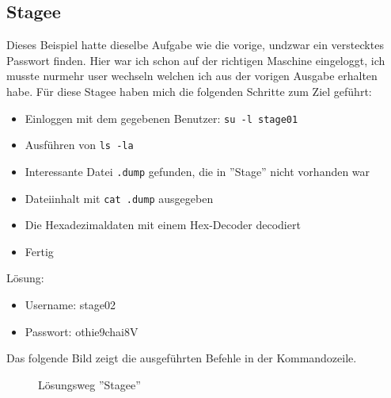 \documentclass[12pt,a4paper,titlepage,oneside]{scrartcl}
\begin{document}
\subsection{Stagee}
Dieses Beispiel hatte dieselbe Aufgabe wie die vorige, undzwar ein verstecktes Passwort finden. Hier war ich schon auf der richtigen Maschine eingeloggt, ich musste nurmehr user wechseln welchen ich aus der vorigen Ausgabe erhalten habe. Für diese Stagee haben mich die folgenden Schritte zum Ziel geführt:

\begin{itemize}
  \item Einloggen mit dem gegebenen Benutzer: \lstinline{su -l stage01}
  \item Ausführen von \lstinline{ls -la}  
  \item Interessante Datei \lstinline{.dump} gefunden, die in ''Stage'' nicht vorhanden war
  \item Dateiinhalt mit \lstinline{cat .dump} ausgegeben
  \item Die Hexadezimaldaten mit einem Hex-Decoder decodiert
  \item Fertig
\end{itemize}
  
Lösung:
\begin{itemize}
  \item Username: stage02 
  \item Passwort: othie9chai8V
\end{itemize}

Das folgende Bild zeigt die ausgeführten Befehle in der Kommandozeile.
  \begin{figure}[h!]
    \centering
    \caption{Lösungsweg ''Stagee''}
    \label{fig:stagee_solution}
  \end{figure}
\end{document}
